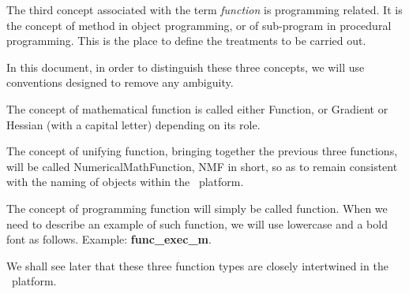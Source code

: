 The third concept associated with the term \emph{function} is programming related. It is the concept of method in object programming, or of sub-program in procedural programming. This is the place to define the treatments to be carried out.

In this document, in order to distinguish these three concepts, we will use conventions designed to remove any ambiguity.

The concept of mathematical function is called either Function, or Gradient or Hessian (with a capital letter) depending on its role.

The concept of unifying function, bringing together the previous three functions, will be called NumericalMathFunction, NMF in short, so as to remain consistent with the naming of objects within the \OT\ platform.

The concept of programming function will simply be called function. When we need to describe an example of such function, we will use lowercase and a bold font as follows. Example: {\bf {}func\_exec\_m}.

We shall see later that these three function types are closely intertwined in the \OT\ platform.
